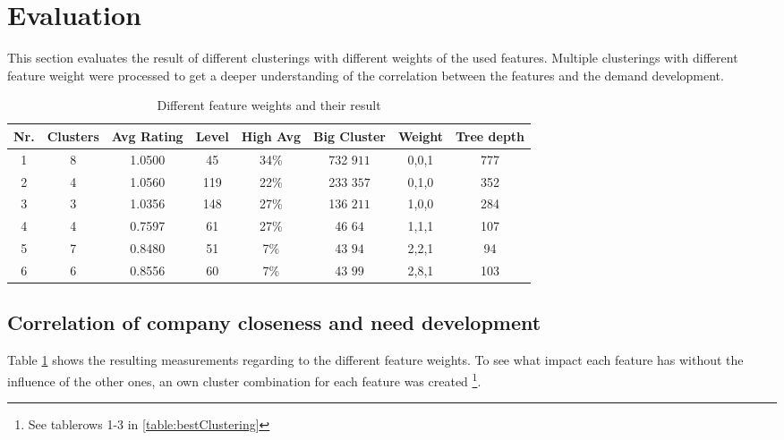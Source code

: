 \section{Evaluation}

This section evaluates the result of different clusterings with different weights of the used features.
Multiple clusterings with different feature weight were processed to get a deeper understanding
of the correlation between the features and the demand development.

{\small
\begin{table}[ht]
  \caption{Different feature weights and their result}
  \label{table:clusteringComparison}
  \begin{tabular}{cccccccc}
    Nr. &  Clusters & Avg Rating & Level & High Avg & Big Cluster & Weight {\tiny Size Industry Location & Tree depth} \\ \hline
    1&          8      & 1.0500     & 45    & 34\%     & 732 \(911\) &  0,0,1          & 777 \\
    2&          4      & 1.0560     & 119   & 22\%     & 233 \(357\) &  0,1,0          & 352 \\
    3&          3      & 1.0356     & 148   & 27\%     & 136 \(211\) &  1,0,0          & 284 \\
    4&          4      & 0.7597     & 61    & 27\%     & 46 \(64\)   &  1,1,1          & 107 \\
    5&          7      & 0.8480     & 51    & 7\%      & 43 \(94\)   & 2,2,1           & 94 \\
    6&          6      & 0.8556     & 60    & 7\%      & 43 \(99\)   & 2,8,1           & 103 \\
  \end{tabular}
\end{table}

}

\subsection{Correlation of company closeness and need development}

Table \ref{table:clusteringComparison} shows the resulting measurements regarding to the different feature weights.
To see what impact each feature has without the influence of the other ones, an own cluster combination for each
feature was created \footnote{See tablerows 1-3 in \ref{table:bestClustering}}.

